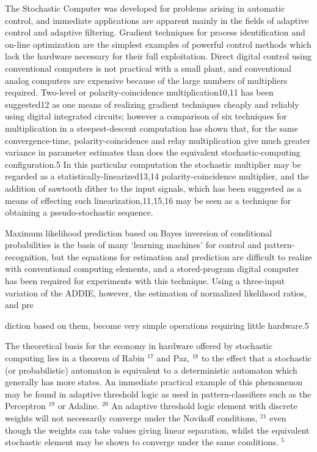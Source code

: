 \documentclass[
  10
]{article}
\begin{document}
The Stochastic Computer was developed for problems arising in automatic
control, and immediate applications are apparent mainly in the fields of
adaptive control and adaptive filtering. Gradient techniques for process
identification and on-line optimization are the simplest examples of
powerful control methods which lack the hardware necessary for their
full exploitation. Direct digital control using conventional computers
is not practical with a small plant, and conventional analog computers
are expensive because of the large numbers of multipliers required.
Two-level or polarity-coincidence multiplication10,11 has been
suggested12 as one means of realizing gradient techniques cheaply and
reliably using digital integrated circuits; however a comparison of six
techniques for multiplication in a steepest-descent computation has
shown that, for the same convergence-time, polarity-coincidence and
relay multiplication give much greater variance in parameter estimates
than does the equivalent stochastic-computing configuration.5 In this
particular computation the stochastic multiplier may be regarded as a
statistically-linearized13,14 polarity-coincidence multiplier, and the
addition of sawtooth dither to the input signals, which has been
suggested as a means of effecting such linearization,11,15,16 may be
seen as a technique for obtaining a pseudo-stochastic sequence.

Maximum likelihood prediction based on Bayes inversion of conditional
probabilities is the basis of many `learning machines' for control and
pattern-recognition, but the equations for estimation and prediction are
difficult to realize with conventional computing elements, and a
stored-program digital computer has been required for experiments with
this technique. Using a three-input variation of the ADDIE, however, the
estimation of normalized likelihood ratios, and pre

diction based on them, become very simple operations requiring little
hardware.5

The theoretical basis for the economy in hardware offered by stochastic
computing lies in a theorem of Rabin \(^{17}\) and Paz, \(^{18}\) to the
effect that a stochastic (or probabilistic) automaton is equivalent to a
deterministic automaton which generally has more states. An immediate
practical example of this phenomenon may be found in adaptive threshold
logic as used in pattern-classifiers such as the Perceptron \(^{19}\) or
Adaline. \(^{20}\) An adaptive threshold logic element with discrete
weights will not necessarily converge under the Novikoff conditions,
\(^{21}\) even though the weights can take values giving linear
separation, whilst the equivalent stochastic element may be shown to
converge under the same conditions. \(^{5}\)
\end{document}
